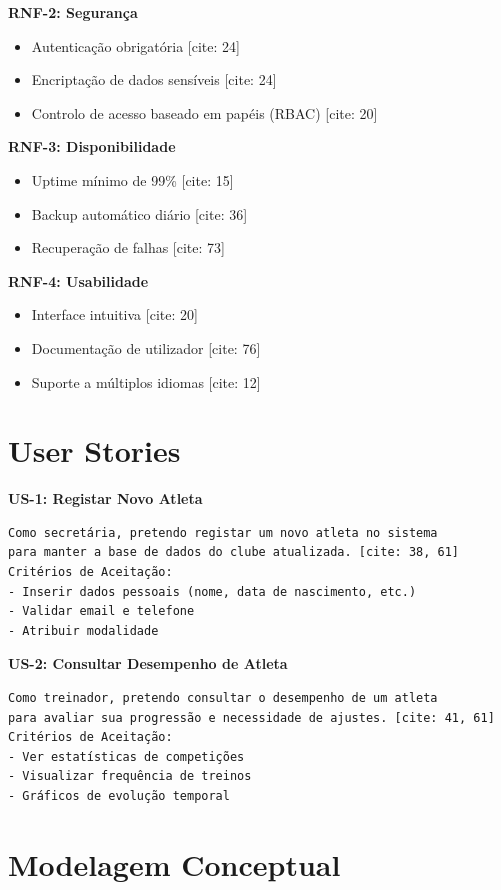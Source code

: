 \documentclass[12pt]{article}
\begin{document}
\textbf{RNF-2: Segurança}
\begin{itemize}
    \item Autenticação obrigatória [cite: 24]
    \item Encriptação de dados sensíveis [cite: 24]
    \item Controlo de acesso baseado em papéis (RBAC) [cite: 20]
\end{itemize}

\textbf{RNF-3: Disponibilidade}
\begin{itemize}
    \item Uptime mínimo de 99\% [cite: 15]
    \item Backup automático diário [cite: 36]
    \item Recuperação de falhas [cite: 73]
\end{itemize}

\textbf{RNF-4: Usabilidade}
\begin{itemize}
    \item Interface intuitiva [cite: 20]
    \item Documentação de utilizador [cite: 76]
    \item Suporte a múltiplos idiomas [cite: 12]
\end{itemize}

\section{User Stories}

\textbf{US-1: Registar Novo Atleta}
\begin{verbatim}
Como secretária, pretendo registar um novo atleta no sistema
para manter a base de dados do clube atualizada. [cite: 38, 61]
Critérios de Aceitação:
- Inserir dados pessoais (nome, data de nascimento, etc.)
- Validar email e telefone
- Atribuir modalidade
\end{verbatim}

\textbf{US-2: Consultar Desempenho de Atleta}
\begin{verbatim}
Como treinador, pretendo consultar o desempenho de um atleta
para avaliar sua progressão e necessidade de ajustes. [cite: 41, 61]
Critérios de Aceitação:
- Ver estatísticas de competições
- Visualizar frequência de treinos
- Gráficos de evolução temporal
\end{verbatim}

\section{Modelagem Conceptual}
\end{document}
